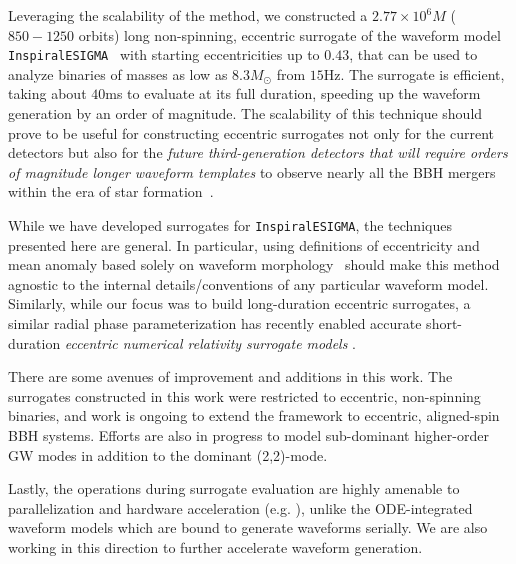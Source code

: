 \documentclass[reprint, superscriptaddress, amsmath, amssymb, aps, prl floatfix]{revtex4-2}
\newcommand{\inspiralesigma}{\texttt{InspiralESIGMA}}
\begin{document}
Leveraging the scalability of the method, we constructed a $2.77\times 10^6M$ ($850-1250$ orbits) long non-spinning, eccentric surrogate of the waveform model \inspiralesigma{}~\citep{Paul:2024ujx} with starting eccentricities up to $0.43$, that can be used to analyze binaries of masses as low as $8.3M_\odot$ from $15$Hz. The surrogate is efficient, taking about $40$ms to evaluate at its full duration, speeding up the waveform generation by an order of magnitude. The scalability of this technique should prove to be useful for constructing eccentric surrogates not only for the current detectors but also for the \textit{future third-generation detectors that will require orders of magnitude longer waveform templates} to observe nearly all the BBH mergers within the era of star formation~\citep{Reitze:2019iox, ET:2019dnz}.

While we have developed surrogates for \inspiralesigma{}, the techniques presented here are general.
In particular, using definitions of eccentricity and mean anomaly based solely on waveform morphology~\citep{Mora:2002gf, Shaikh:2023ypz, Boschini:2024scu, Islam:2025oiv, Shaikh:2025tae} should make this method agnostic to the internal details/conventions of any particular waveform model. Similarly, while our focus was to build long-duration eccentric surrogates, a similar radial phase parameterization has recently enabled accurate short-duration \textit{eccentric numerical relativity surrogate models} \cite{Nee:2025nmh}.

There are some avenues of improvement and additions in this work. The surrogates constructed in this work were restricted to eccentric, non-spinning binaries, and work is ongoing to extend the framework to eccentric, aligned-spin BBH systems. Efforts are also in progress to model sub-dominant higher-order GW modes in addition to the dominant (2,2)-mode.  

Lastly, the operations during surrogate evaluation are highly amenable to parallelization and hardware acceleration (e.g. \cite{Khan:2020fso, Thomas:2022rmc, Thomas:2025rje, Edwards:2023sak}), unlike the ODE-integrated waveform models which are bound to generate waveforms serially. We are also working in this direction to further accelerate waveform generation. 
\end{document}
